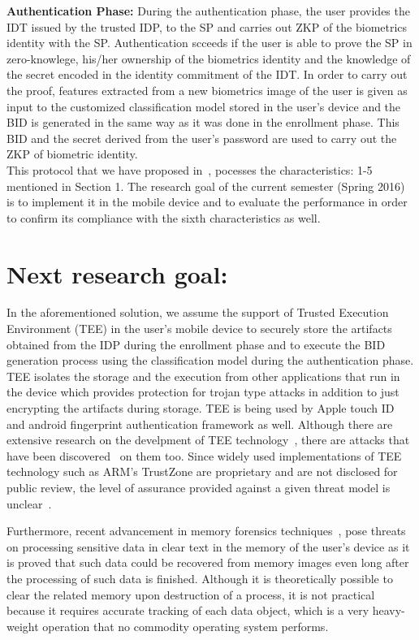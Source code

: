 \documentclass[10pt]{article}
\begin{document}
\textbf{Authentication Phase:}
During the authentication phase, the user provides the IDT issued by the trusted IDP, to the SP and carries out ZKP of the biometrics identity with 
the SP.
Authentication scceeds if the user is able to prove the SP in zero-knowlege, his/her ownership of the biometrics identity and the knowledge of 
the secret encoded in the identity commitment of the IDT. In order to carry out the proof, features extracted from a new biometrics image of the user 
is given as input to the customized classification model stored in the user's device and the BID is generated in the same way as it was done in the 
enrollment phase. This BID and the secret derived from the user's password are used to carry out the ZKP of biometric identity.\\

This protocol that we have proposed in~\cite{ours}, pocesses the characteristics: 1-5 mentioned in Section 1. The research goal of the current 
semester (Spring 2016) is to implement it in the mobile device and to evaluate the performance in order to confirm its compliance with the sixth 
characteristics as well.

\section{Next research goal:}
In the aforementioned solution, we assume the support of Trusted Execution Environment  (TEE) in the user's mobile device to securely store the 
artifacts obtained from the IDP during the enrollment phase and to execute the BID generation process using the classification model during the 
authentication phase. 
TEE isolates the storage and the execution from other applications that run in the device which provides protection for trojan type attacks in 
addition to just encrypting the artifacts during storage. TEE is being used by Apple touch ID and android fingerprint authentication framework 
as well.
Although there are extensive research on the develpment of TEE technology~\cite{tee}, there are attacks that have been discovered~\cite{blackhat} on 
them too.
Since widely used implementations of TEE technology such as ARM's TrustZone are proprietary and are not disclosed for public review, the level of 
assurance provided against a given threat model is unclear~\cite{armtrustzone}. 

Furthermore, recent advancement in memory forensics techniques~\cite{dimsum}, pose threats on processing sensitive data in clear text in the memory 
of the user's device as it is proved that such data could be recovered from memory images even long after the processing of such data is finished. 
Although it is theoretically possible to clear the related memory upon destruction of a process, it is not practical because it requires 
accurate tracking of each data object, which is a very heavy-weight operation that no commodity operating system performs.
\end{document}
